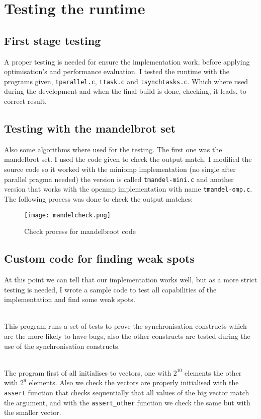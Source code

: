 \section{Testing the runtime}

\subsection{First stage testing}
A proper testing is needed for ensure the implementation work, before applying optimisation's and performance evaluation. I tested the runtime with the programs given, \texttt{tparallel.c}, \texttt{ttask.c} and \texttt{tsynchtasks.c}. Which where used during the development and when the final build is done, checking, it leads, to correct result.

\subsection{Testing with the mandelbrot set}
Also some algorithms where used for the testing. The first one was the mandelbrot set. I used the code given to check the output match. I modified the source code so it worked with the miniomp implementation (no single after parallel pragma needed) the version is called \texttt{tmandel-mini.c} and another version that works with the openmp implementation with name \texttt{tmandel-omp.c}. The following process was done to check the output matches:

\begin{figure}[h!]
    \centering
    \texttt{[image: mandelcheck.png]}
    \caption{Check process for mandelbroot code}
\end{figure}

\subsection{Custom code for finding weak spots}
At this point we can tell that our implementation works well, but as a more strict testing is needed, I wrote a sample code to test all capabilities of the implementation and find some weak spots. 

\par ~\\
This program runs a set of tests to prove the synchronisation constructs which are the more likely to have bugs, also the other constructs are tested during the use of the synchronisation constructs.
\par ~\\
The program first of all initialises to vectors, one with $2^{10}$ elements the other with $2^9$ elements. Also we check the vectors are properly initialised with the \texttt{assert} function that checks sequentially that all values of the big vector match the argument, and with the \texttt{assert\_other} function we check the same but with the smaller vector.


